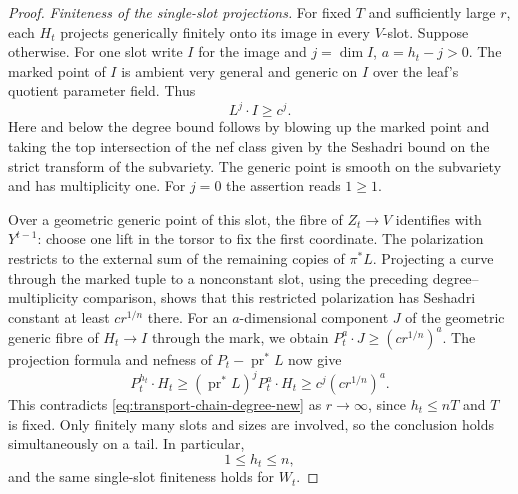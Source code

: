 \begin{proof}
\medskip\noindent\emph{Finiteness of the single-slot projections.}
For fixed $T$ and sufficiently large $r$, each $H_t$ projects
generically finitely onto its image in every $V$-slot. Suppose
otherwise. For one slot write $I$ for the image and
$j=\dim I$, $a=h_t-j>0$. The marked point of $I$ is ambient
very general and generic on $I$ over the leaf's quotient parameter
field. Thus
\begin{equation}\label{eq:transport-image-bound-new}
 L^j\cdot I\ge c^j.
\end{equation}
Here and below the degree bound follows by blowing up the marked
point and taking the top intersection of the nef class given
by the Seshadri bound on the strict transform of the subvariety.
The generic point is smooth on the subvariety and has multiplicity
one. For $j=0$ the assertion reads $1\ge1$.

Over a geometric generic point of this slot, the fibre of
$Z_t\to V$ identifies with $Y^{t-1}$: choose one lift in the
torsor to fix the first coordinate. The polarization restricts
to the external sum of the remaining copies of $\pi^*L$.
Projecting a curve through the marked tuple to a nonconstant
slot, using the preceding degree--multiplicity comparison,
shows that this restricted polarization has Seshadri constant
at least $cr^{1/n}$ there. For an $a$-dimensional component $J$
of the geometric generic fibre of $H_t\to I$ through the mark,
we obtain $P_t^a\cdot J\ge(cr^{1/n})^a$.
The projection formula and nefness of
$P_t-\operatorname{pr}^*L$ now give
\[
 P_t^{h_t}\cdot H_t
 \ge(\operatorname{pr}^*L)^jP_t^a\cdot H_t
 \ge c^j(cr^{1/n})^a.
\]
This contradicts \eqref{eq:transport-chain-degree-new} as
$r\to\infty$, since $h_t\le nT$ and $T$ is fixed.
Only finitely many slots and sizes are involved, so the conclusion
holds simultaneously on a tail. In particular,
\begin{equation}\label{eq:transport-dimension-new}
 1\le h_t\le n,
\end{equation}
and the same single-slot finiteness holds for $W_t$.


\end{proof}
